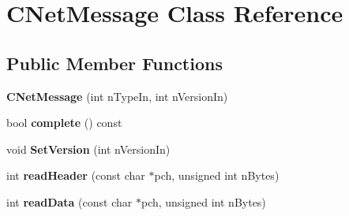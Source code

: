 \hypertarget{class_c_net_message}{}\section{C\+Net\+Message Class Reference}
\label{class_c_net_message}
\subsection*{Public Member Functions}
\begin{DoxyCompactItemize}
\item 
\mbox{\label{class_c_net_message_aa70db259a11e329ece8e9db4b895982c}} 
{\bfseries C\+Net\+Message} (int n\+Type\+In, int n\+Version\+In)
\item 
\mbox{\label{class_c_net_message_ae3b5f6110ae9a3c06397894cd46ab224}} 
bool {\bfseries complete} () const
\item 
\mbox{\label{class_c_net_message_a63b9f2351d5e92126cacacd51d9e16b6}} 
void {\bfseries Set\+Version} (int n\+Version\+In)
\item 
\mbox{\label{class_c_net_message_a3e58f5f29b23d1377f8fd15fc75c78ac}} 
int {\bfseries read\+Header} (const char $\ast$pch, unsigned int n\+Bytes)
\item 
\mbox{\label{class_c_net_message_adbc1669a56462daea5f37e5e99117f8c}} 
int {\bfseries read\+Data} (const char $\ast$pch, unsigned int n\+Bytes)
\end{DoxyCompactItemize}
